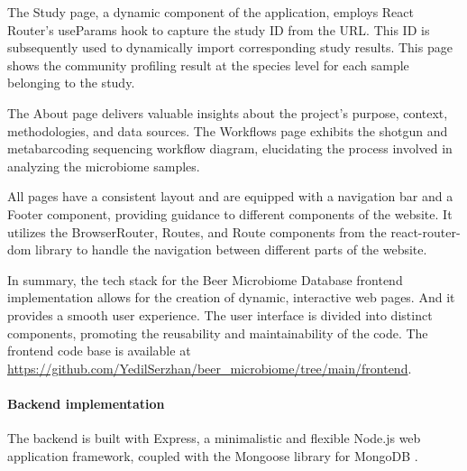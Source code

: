             The Study page, a dynamic component of the application, employs React Router's useParams hook to capture the study ID from the URL. This ID is subsequently used to dynamically import corresponding study results. This page shows the community profiling result at the species level for each sample belonging to the study.
            
            The About page delivers valuable insights about the project's purpose, context, methodologies, and data sources. The Workflows page exhibits the shotgun and metabarcoding sequencing workflow diagram, elucidating the process involved in analyzing the microbiome samples.
            
            All pages have a consistent layout and are equipped with a navigation bar and a Footer component, providing guidance to different components of the website. It utilizes the BrowserRouter, Routes, and Route components from the react-router-dom library to handle the navigation between different parts of the website.
                        
            In summary, the tech stack for the Beer Microbiome Database frontend implementation allows for the creation of dynamic, interactive web pages. And it provides a smooth user experience. The user interface is divided into distinct components, promoting the reusability and maintainability of the code. The frontend code base is available at \url{https://github.com/YedilSerzhan/beer_microbiome/tree/main/frontend}. 

        
        
        \paragraph*{Backend implementation}
        
            The backend is built with Express, a minimalistic and flexible Node.js web application framework, coupled with the Mongoose library for MongoDB \cite{banker2016mongodb}. 

